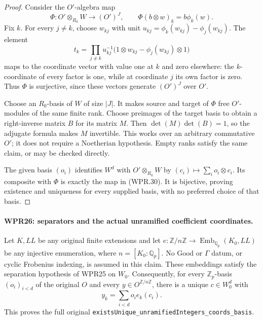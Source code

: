 \documentclass[11pt,a4paper]{article}
\numberwithin{equation}{section}
\theoremstyle{remark}\newtheorem{remark}[theorem]{Remark}
\begin{document}
\begin{proof}
Consider the $O'$-algebra map
\[
 \Phi:O'\otimes_{R_0}W\longrightarrow(O')^J,
 \qquad \Phi(b\otimes w)_k=b\phi_k(w).
\]
Fix $k$. For every $j\ne k$, choose $w_{kj}$ with unit
$u_{kj}=\phi_k(w_{kj})-\phi_j(w_{kj})$. The element
\[
 t_k=\prod_{j\ne k}u_{kj}^{-1}
        \bigl(1\otimes w_{kj}-\phi_j(w_{kj})\otimes1\bigr)
\]
maps to the coordinate vector with value one at $k$ and zero
elsewhere: the $k$-coordinate of every factor is one, while
at coordinate $j$ its own factor is zero. Thus $\Phi$ is
surjective, since these vectors generate $(O')^J$ over $O'$.

Choose an $R_0$-basis of $W$ of size $|J|$. It makes source
and target of $\Phi$ free $O'$-modules of the same finite rank.
Choose preimages of the target basis to obtain a right-inverse
matrix $B$ for its matrix $M$. Then
$\det(M)\det(B)=1$, so the adjugate formula makes $M$ invertible.
This works over an arbitrary commutative $O'$; it does not
require a Noetherian hypothesis. Empty ranks satisfy the same
claim, or may be checked directly.

The given basis $(o_i)$ identifies $W^d$ with
$O'\otimes_{R_0}W$ by $(c_i)\mapsto\sum_i o_i\otimes c_i$.
Its composite with $\Phi$ is exactly the map in (WPR.30).
It is bijective, proving existence and uniqueness for every
supplied basis, with no preferred choice of that basis.
\end{proof}

\paragraph{WPR26: separators and the actual unramified coefficient coordinates.}
\label{claim:WPR26}
Let $K,LL$ be any original finite extensions and let
$e:\mathbb Z/n\mathbb Z\to\operatorname{Emb}_{\mathbb Q_p}(K_0,LL)$
be any injective enumeration, where $n=[K_0:\mathbb Q_p]$.
No $\mathrm{Good}$ or $\Gamma$ datum, or cyclic Frobenius
indexing, is assumed in this claim. These embeddings satisfy
the separation hypothesis of WPR25 on $W_0$. Consequently,
for every $\mathbb Z_p$-basis
$(o_i)_{i<d}$ of the original $O$ and every $y\in O^{\mathbb Z/n\mathbb Z}$,
there is a unique $c\in W_0^d$ with
\[
                    y_k=\sum_{i<d}o_i e_k(c_i).
 \tag{WPR.31}
\]
This proves the full original
\texttt{exists\allowbreak Unique\_\allowbreak unramified\allowbreak Integers\_\allowbreak coords\_\allowbreak basis}.
\end{document}
